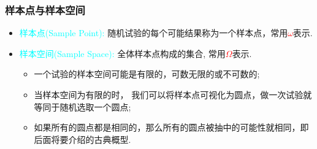\begin{frame}
	\frametitle{样本点与样本空间}
	\begin{itemize}[<+-|alert@+>]
		\item \textcolor{cyan}{样本点({\rm Sample Point}):} 随机试验的每个可能结果称为一个样本点，常用\textcolor{red}{$\omega$}表示.
		\item \textcolor{cyan}{样本空间({\rm Sample Space}):} 全体样本点构成的集合, 常用\textcolor{red}{$\Omega$}表示.
	\begin{itemize}[<+-|alert@+>]
		\item 一个试验的样本空间可能是有限的，可数无限的或不可数的;
		\item 当样本空间为有限的时， 我们可以将样本点可视化为圆点，做一次试验就等同于随机选取一个圆点;
		\item 如果所有的圆点都是相同的，那么所有的圆点被抽中的可能性就相同，即后面将要介绍的古典概型.
	\end{itemize}
	\end{itemize}
\end{frame}




